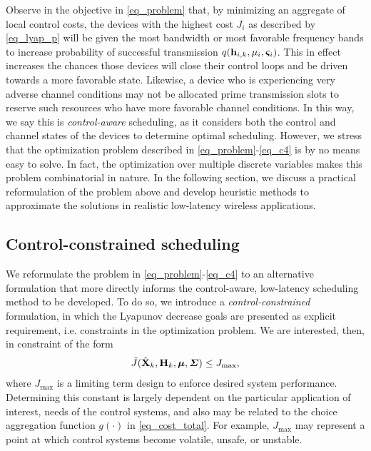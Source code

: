 Observe in the objective in \eqref{eq_problem} that, by minimizing an aggregate of local control costs, the devices with the highest cost $J_i$ as described by \eqref{eq_lyap_p} will be given the most bandwidth or most favorable frequency bands to increase probability of successful transmission $q({\mathbf h}_{i,k},\mu_i,\boldsymbol{\varsigma}_i)$. This in effect increases the chances those devices will close their control loops and be driven towards a more favorable state. Likewise, a device who is experiencing very adverse channel conditions may not be allocated prime transmission slots to reserve such resources who have more favorable channel conditions. In this way, we say this is \emph{control-aware} scheduling, as it considers both the control and channel states of the devices to determine optimal scheduling. However, we stress that the optimization problem described in \eqref{eq_problem}-\eqref{eq_c4} is by no means easy to solve. In fact, the optimization over multiple discrete variables makes this problem combinatorial in nature. In the following section, we discuss a practical reformulation of the problem above and develop heuristic methods to approximate the solutions in realistic low-latency wireless applications. 



\subsection{Control-constrained scheduling}\label{sec_optimal_b}
We reformulate the problem in \eqref{eq_problem}-\eqref{eq_c4} to an alternative formulation that more directly informs the control-aware, low-latency scheduling method to be developed. To do so, we introduce a \emph{control-constrained} formulation, in which the Lyapunov decrease goals are presented as explicit requirement, i.e. constraints in the optimization problem. We are interested, then, in constraint of the form
%
\begin{align}\label{eq_control_constraint}
\tdJ(\hbX_{k},\bbH_{k}, \bbmu, \bbSigma) \leq J_{\max},
\end{align}
%
where $J_{\max}$ is a limiting term design to enforce desired system performance. Determining this constant is largely dependent on the particular application of interest, needs of the control systems, and also may be related to the choice aggregation function $g(\cdot)$ in \eqref{eq_cost_total}. For example, $J_{\max}$ may represent a point at which control systems become volatile, unsafe, or unstable.

